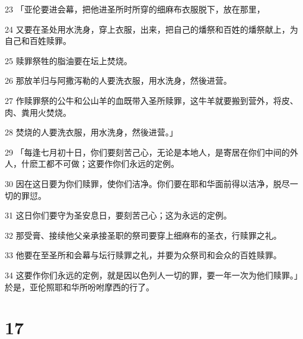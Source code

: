 \par 23 「亚伦要进会幕，把他进圣所时所穿的细麻布衣服脱下，放在那里，
\par 24 又要在圣处用水洗身，穿上衣服，出来，把自己的燔祭和百姓的燔祭献上，为自己和百姓赎罪。
\par 25 赎罪祭牲的脂油要在坛上焚烧。
\par 26 那放羊归与阿撒泻勒的人要洗衣服，用水洗身，然後进营。
\par 27 作赎罪祭的公牛和公山羊的血既带入圣所赎罪，这牛羊就要搬到营外，将皮、肉、粪用火焚烧。
\par 28 焚烧的人要洗衣服，用水洗身，然後进营。」
\par 29 「每逢七月初十日，你们要刻苦己心，无论是本地人，是寄居在你们中间的外人，什麽工都不可做；这要作你们永远的定例。
\par 30 因在这日要为你们赎罪，使你们洁净。你们要在耶和华面前得以洁净，脱尽一切的罪愆。
\par 31 这日你们要守为圣安息日，要刻苦己心；这为永远的定例。
\par 32 那受膏、接续他父亲承接圣职的祭司要穿上细麻布的圣衣，行赎罪之礼。
\par 33 他要在至圣所和会幕与坛行赎罪之礼，并要为众祭司和会众的百姓赎罪。
\par 34 这要作你们永远的定例，就是因以色列人一切的罪，要一年一次为他们赎罪。」於是，亚伦照耶和华所吩咐摩西的行了。

\chapter{17}

